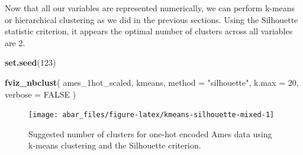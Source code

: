 \documentclass[]{book}
\newenvironment{Shaded}{\begin{snugshade}}{\end{snugshade}}
\newcommand{\CommentTok}[1]{\textcolor[rgb]{0.56,0.35,0.01}{\textit{#1}}}
\newcommand{\DataTypeTok}[1]{\textcolor[rgb]{0.13,0.29,0.53}{#1}}
\newcommand{\DecValTok}[1]{\textcolor[rgb]{0.00,0.00,0.81}{#1}}
\newcommand{\KeywordTok}[1]{\textcolor[rgb]{0.13,0.29,0.53}{\textbf{#1}}}
\newcommand{\NormalTok}[1]{#1}
\newcommand{\OperatorTok}[1]{\textcolor[rgb]{0.81,0.36,0.00}{\textbf{#1}}}
\newcommand{\OtherTok}[1]{\textcolor[rgb]{0.56,0.35,0.01}{#1}}
\newcommand{\StringTok}[1]{\textcolor[rgb]{0.31,0.60,0.02}{#1}}
\theoremstyle{definition}
\theoremstyle{definition}
\theoremstyle{definition}
\theoremstyle{remark}
\begin{document}
\begin{Shaded}
\end{Shaded}

Now that all our variables are represented numerically, we can perform
k-means or hierarchical clustering as we did in the previous sections.
Using the Silhouette statistic criterion, it appears the optimal number
of clusters across all variables are 2.

\begin{Shaded}
\begin{Highlighting}[]
\KeywordTok{set.seed}\NormalTok{(}\DecValTok{123}\NormalTok{)}

\KeywordTok{fviz_nbclust}\NormalTok{(}
\NormalTok{  ames_1hot_scaled, }
\NormalTok{  kmeans, }
  \DataTypeTok{method =} \StringTok{"silhouette"}\NormalTok{, }
  \DataTypeTok{k.max =} \DecValTok{20}\NormalTok{, }
  \DataTypeTok{verbose =} \OtherTok{FALSE}
\NormalTok{  )}
\end{Highlighting}
\end{Shaded}

\begin{figure}

{\centering \texttt{[image: abar\_files/figure-latex/kmeans-silhouette-mixed-1]} 

}

\caption{Suggested number of clusters for one-hot encoded Ames data using k-means clustering and the Silhouette criterion.}\label{fig:kmeans-silhouette-mixed}
\end{figure}
\end{document}
